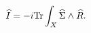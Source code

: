 \begin{equation}
\widehat{I} =-i{\rm Tr}\int_X \widehat{\Sigma }\wedge \widehat{R}.\label{accionnc}
\end{equation}

